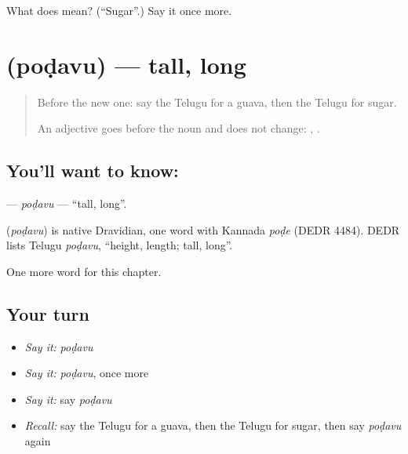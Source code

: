 \begin{tcolorbox}[breakable,colback=teal!4,colframe=teal!35!black,title={Before you move on}]
What does  mean? (\textquotedblleft{}Sugar\textquotedblright{}.) Say it once more.
\end{tcolorbox}
\section[\texorpdfstring{\te{పొడవు} (poḍavu)}{పొడవు (poḍavu)}]{ (poḍavu) — tall, long}

\label{lesson:TE-C136-podavu}



\begin{quote}
Before the new one: say the Telugu for a guava, then the Telugu for sugar.

An adjective goes before the noun and does not change: \textbf{ }, \textbf{ }.
\end{quote}

\subsection*{You'll want to know: }
\textbf{} — \emph{poḍavu} — \textquotedblleft{}tall, long\textquotedblright{}.

\begin{cousinweb}
\textbf{} (\emph{poḍavu}) is native Dravidian, one word with Kannada \emph{poḍe} (DEDR 4484). DEDR lists Telugu \emph{poḍavu}, \textquotedblleft{}height, length; tall, long\textquotedblright{}.
\end{cousinweb}

\begin{grammarlens}[title={What you've built}]
One more word for this chapter.
\end{grammarlens}

\subsection*{Your turn}
\begin{itemize}
\raggedright
  \item \emph{Say it:} \emph{poḍavu}
  \item \emph{Say it:} \emph{poḍavu}, once more
  \item \emph{Say it:} say \emph{poḍavu}
  \item \emph{Recall:} say the Telugu for a guava, then the Telugu for sugar, then say \emph{poḍavu} again
\end{itemize}

